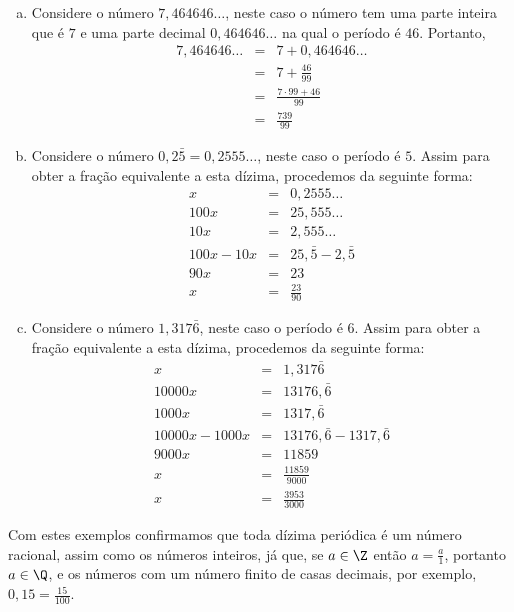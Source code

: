\begin{exem}
\begin{enumerate}[a)]
   \item Considere o número $7,464646 \ldots$, neste caso o número tem uma parte inteira que é $7$ e uma parte decimal $0,464646 \ldots$ na qual o período é $46$. Portanto,
   \begin{eqnarray*}
    7,464646 \ldots &=& 7+0,464646 \ldots \\
    &=& 7 + \frac{46}{99} \\
    &=& \frac{7\cdot 99 + 46}{99}\\
    &=& \frac{739}{99}
   \end{eqnarray*}

   \item Considere o número $0,2\bar{5}= 0,2555 \ldots$, neste caso o período é $5$. Assim para obter a fração equivalente a esta dízima, procedemos da seguinte forma:
   \begin{eqnarray*}
    x &=& 0,2555 \ldots \\
    100x &=& 25,555 \ldots \\
    10x &=& 2,555 \ldots \\
    100x - 10x &=& 25,\bar{5} - 2, \bar{5} \\
    90x &=& 23 \\
    x&=& \frac{23}{90}
   \end{eqnarray*}

   \item Considere o número $1,317\bar{6}$, neste caso o período é $6$. Assim para obter a fração equivalente a esta dízima, procedemos da seguinte forma:
   \begin{eqnarray*}
    x &=& 1,317\bar{6} \\
    10000 x &=& 13176, \bar{6} \\
    1000 x &=& 1317,\bar{6}\\
    10000 x - 1000 x &=& 13176, \bar{6} - 1317,\bar{6}\\
    9000 x &=& 11859 \\
    x &=& \frac{11859}{9000}\\
    x &=& \frac{3953}{3000}
   \end{eqnarray*}

  \end{enumerate}

 \end{exem}

Com estes exemplos confirmamos que toda dízima periódica é um número racional, assim como os números inteiros, já que, se $a \in \Z$ então $a=\frac{a}{1}$, portanto $a \in \Q$, e os números com um número finito de casas decimais, por exemplo, $0,15= \frac{15}{100}$.


